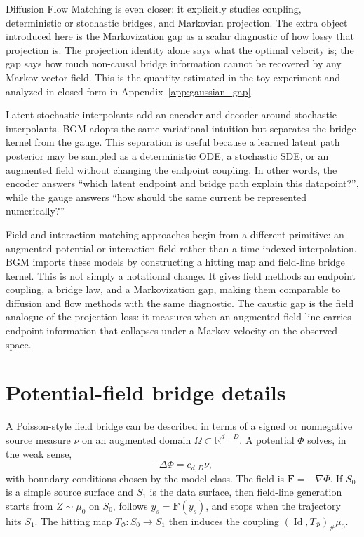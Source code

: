 \documentclass{article}
\numberwithin{equation}{section}
\newcommand{\R}{\mathbb{R}}
\newcommand{\F}{\bm F}
\newcommand{\Id}{\operatorname{Id}}
\begin{document}
Diffusion Flow Matching is even closer: it explicitly studies coupling, deterministic or stochastic bridges, and Markovian projection. The extra object introduced here is the Markovization gap as a scalar diagnostic of how lossy that projection is. The projection identity alone says what the optimal velocity is; the gap says how much non-causal bridge information cannot be recovered by any Markov vector field. This is the quantity estimated in the toy experiment and analyzed in closed form in Appendix~\ref{app:gaussian_gap}.

Latent stochastic interpolants add an encoder and decoder around stochastic interpolants. BGM adopts the same variational intuition but separates the bridge kernel from the gauge. This separation is useful because a learned latent path posterior may be sampled as a deterministic ODE, a stochastic SDE, or an augmented field without changing the endpoint coupling. In other words, the encoder answers ``which latent endpoint and bridge path explain this datapoint?'', while the gauge answers ``how should the same current be represented numerically?''

Field and interaction matching approaches begin from a different primitive: an augmented potential or interaction field rather than a time-indexed interpolation. BGM imports these models by constructing a hitting map and field-line bridge kernel. This is not simply a notational change. It gives field methods an endpoint coupling, a bridge law, and a Markovization gap, making them comparable to diffusion and flow methods with the same diagnostic. The caustic gap is the field analogue of the projection loss: it measures when an augmented field line carries endpoint information that collapses under a Markov velocity on the observed space.

\section{Potential-field bridge details}
\label{app:potential_details}

A Poisson-style field bridge can be described in terms of a signed or nonnegative source measure \(\nu\) on an augmented domain \(\Omega\subset\R^{d+D}\). A potential \(\Phi\) solves, in the weak sense,
\begin{equation}
    -\Delta \Phi = c_{d,D}\nu,
\end{equation}
with boundary conditions chosen by the model class. The field is \(\F=-\nabla\Phi\). If \(S_0\) is a simple source surface and \(S_1\) is the data surface, then field-line generation starts from \(Z\sim\mu_0\) on \(S_0\), follows \(\dot y_s=\F(y_s)\), and stops when the trajectory hits \(S_1\). The hitting map \(T_\Phi:S_0\to S_1\) then induces the coupling \((\Id,T_\Phi)_\#\mu_0\).
\end{document}
